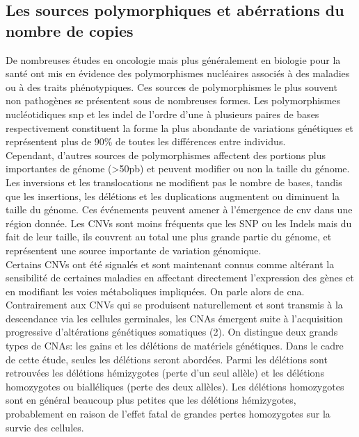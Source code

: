 \documentclass{style}
\begin{document}
\subsection{Les sources polymorphiques et abérrations du nombre de copies}
De nombreuses études en oncologie mais plus généralement en biologie pour la santé ont mis en évidence des polymorphismes nucléaires associés à des maladies ou à des traits phénotypiques. 
Ces sources de polymorphismes le plus souvent non pathogènes se présentent sous de nombreuses formes. Les polymorphismes nucléotidiques \acrfull{snp} et les \acrfull{indel} de l'ordre d'une à plusieurs paires de bases respectivement constituent la forme la plus abondante de variations génétiques et représentent plus de 90\% de toutes les différences entre individus. \\
Cependant, d’autres sources de polymorphismes affectent des portions plus importantes de génome (>50pb) et peuvent modifier ou non la taille du génome. Les inversions et les translocations ne modifient pas le nombre de bases, tandis que les insertions, les délétions et les duplications augmentent ou diminuent la taille du génome. Ces événements peuvent amener à l’émergence de \acrfull{cnv} dans une région donnée. Les CNVs sont moins fréquents que les SNP ou les Indels mais du fait de leur taille, ils couvrent au total une plus grande partie du génome, et représentent une source importante de variation génomique. \\
Certains CNVs ont été signalés et sont maintenant connus comme altérant la sensibilité de certaines maladies en affectant directement l’expression des gènes et en modifiant les voies métaboliques impliquées. On parle alors de \acrfull{cna}. Contrairement aux CNVs qui se produisent naturellement et sont transmis à la descendance via les cellules germinales, les CNAs émergent suite à l'acquisition progressive d'altérations génétiques somatiques (2). On distingue deux grands types de CNAs: les gains et les délétions de matériels génétiques. Dans le cadre de cette étude,  seules les délétions seront abordées. Parmi les délétions sont retrouvées les délétions hémizygotes (perte d’un seul allèle) et les délétions homozygotes ou bialléliques (perte des deux allèles). Les délétions homozygotes sont en général beaucoup plus petites que les délétions hémizygotes, probablement en raison de l'effet fatal de grandes pertes homozygotes sur la survie des cellules.
\end{document}
